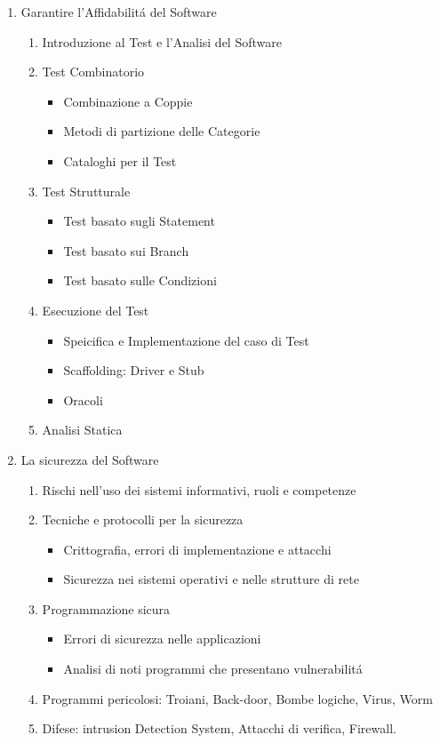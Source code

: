 \begin{enumerate}
	\item Garantire l'Affidabilitá del Software
	\begin{enumerate}
		\item Introduzione al Test e l'Analisi del Software
		\item Test Combinatorio
		\begin{itemize}
			\item Combinazione a Coppie
			\item Metodi di partizione delle Categorie
			\item Cataloghi per il Test
		\end{itemize}
		\item Test Strutturale
		\begin{itemize}
			\item Test basato sugli Statement
			\item Test basato sui Branch
			\item Test basato sulle Condizioni
		\end{itemize}
		\item Esecuzione del Test
		\begin{itemize}
			\item Speicifica e Implementazione del caso di Test
			\item Scaffolding: Driver e Stub
			\item Oracoli
		\end{itemize}
		\item Analisi Statica
	\end{enumerate}
	\item La sicurezza del Software
	\begin{enumerate}
		\item Rischi nell'uso dei sistemi informativi, ruoli e competenze
		\item Tecniche e protocolli per la sicurezza
		\begin{itemize}
			\item Crittografia, errori di implementazione e attacchi
			\item Sicurezza nei sistemi operativi e nelle strutture di rete
		\end{itemize}
		\item Programmazione sicura
		\begin{itemize}
			\item Errori di sicurezza nelle applicazioni
			\item Analisi di noti programmi che presentano vulnerabilitá
		\end{itemize}
		\item Programmi pericolosi: Troiani, Back-door, Bombe logiche, Virus, Worm
		\item Difese: intrusion Detection System, Attacchi di verifica, Firewall.
	\end{enumerate}
\end{enumerate}